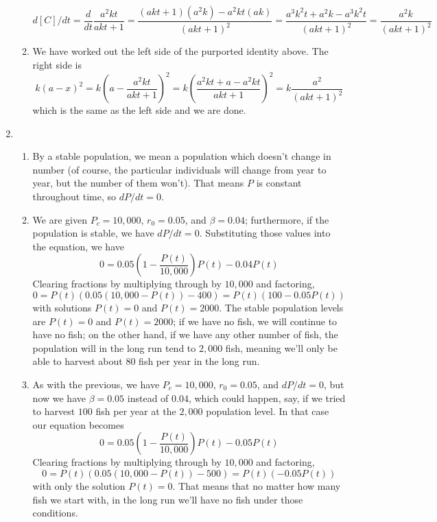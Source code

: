 \documentclass{article}
\begin{document}
\begin{enumerate}
\begin{enumerate}
\begin{equation*}
      d[C]/dt= \frac{d}{dt} \frac{a^2kt}{akt+1}
      = \frac{(akt+1)(a^2k)-a^2kt(ak)}{(akt+1)^2}
      = \frac{a^3k^2t+a^2k-a^3k^2t}{(akt+1)^2}
      = \frac{a^2k}{(akt+1)^2}
    \end{equation*}
  \item We have worked out the left side of the purported identity
    above.  The right side is
    \begin{equation*}
      k(a-x)^2 = k\left(a-\frac{a^2kt}{akt+1}\right)^2
      = k\left(\frac{a^2kt+a-a^2kt}{akt+1}\right)^2
      = k\frac{a^2}{(akt+1)^2}
    \end{equation*}
    which is the same as the left side and we are done.
  \end{enumerate}
\item %
  \begin{enumerate}
  \item By a stable population, we mean a population which doesn't
    change in number (of course, the particular individuals will
    change from year to year, but the number of them won't).  That
    means $P$ is constant throughout time, so $dP/dt=0$.
  \item We are given $P_c=10,000$, $r_0=0.05$, and $\beta=0.04$;
    furthermore, if the population is stable, we have $dP/dt=0$.
    Substituting those values into the equation, we have
    \begin{equation*}
      0 = 0.05\left(1-\frac{P(t)}{10,000}\right)P(t)-0.04P(t)
    \end{equation*}
    Clearing fractions by multiplying through by $10,000$ and
    factoring,
    \begin{equation*}
      0 = P(t) (0.05 \left(10,000 - P(t)\right) - 400)
      = P(t) (100 - 0.05P(t))
    \end{equation*}
    with solutions $P(t)=0$ and $P(t)=2000$.  The stable population
    levels are $P(t)=0$ and $P(t)=2000$; if we have no fish, we will
    continue to have no fish; on the other hand, if we have any other
    number of fish, the population will in the long run tend to
    $2,000$ fish, meaning we'll only be able to harvest about 80 fish
    per year in the long run.
  \item As with the previous, we have $P_c=10,000$, $r_0=0.05$, and
    $dP/dt=0$, but now we have $\beta=0.05$ instead of $0.04$, which
    could happen, say, if we tried to harvest $100$ fish per year at
    the $2,000$ population level.  In that case our equation becomes
    \begin{equation*}
      0 = 0.05\left(1-\frac{P(t)}{10,000}\right)P(t)-0.05P(t)
    \end{equation*}
    Clearing fractions by multiplying through by $10,000$ and
    factoring,
    \begin{equation*}
      0 = P(t) (0.05 \left(10,000 - P(t)\right) - 500)
      = P(t) (-0.05P(t))
    \end{equation*}
    with only the solution $P(t)=0$.  That means that no matter how
    many fish we start with, in the long run we'll have no fish under
    those conditions.
  \end{enumerate}
\end{enumerate}
\end{document}
